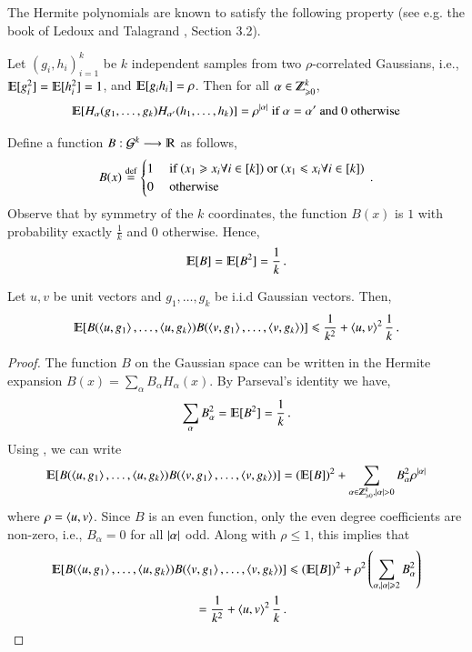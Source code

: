 \documentclass[11pt]{article}
\begin{document}
	The Hermite polynomials 
are known to satisfy the following
	property (see e.g. the book of Ledoux and Talagrand
	\cite{LedouxT}, Section 3.2).
	\begin{fact} \label{fact:rho}
	Let $(g_i,h_i)_{i=1}^k$ be $k$ independent samples from two
	$\rho$-correlated Gaussians, i.e., $\E[g_i^2] = \E[h_i^2] = 1$,
	and $\E[g_i h_i] = \rho$.  Then for all $\alpha \in \N^k$,
	$$ \E[H_{\alpha}(g_1,\ldots,g_k)H_{\alpha'}(h_1,\ldots,h_k)] =
	\rho^{\Abs{\alpha}} \text{ if } \alpha = \alpha' \textrm{ and }   0 \text{
	otherwise}$$
	\end{fact}

	Define a function $B: \cG^k \longrightarrow \mathbb{R}$ as follows,
\[ B(x) \stackrel{\textup{def}}{=} \begin{cases} 1 & \textrm{ if } (x_1 \geqslant x_i \forall i \in [k]) \textrm{ or } (x_1 \leqslant x_i \forall i \in
	[k]) \\ 		0 & \textrm{ otherwise } \end{cases} \,. \]
Observe that by symmetry of the $k$ coordinates, the function $B(x)$
is $1$ with probability exactly $\frac{1}{k}$ and $0$ otherwise.
Hence,
\[  \E[B] = \E[B^2] = \frac{1}{k} \mper \]	
%
\begin{lemma} 
\label{lem:product-of-max}
Let $u,v$ be unit vectors and $g_1,\ldots,g_k$ be i.i.d Gaussian vectors.  Then,
\[ \E[B(\inprod{u,g_1},\ldots,\inprod{u,g_k})B(\inprod{v,g_1},\ldots,\inprod{v,g_k})] \leq 
 \frac{1}{k^2} +  \inprod{u,v}^2 \frac{1}{k} \mper \]
\end{lemma}
\begin{proof}
The function $B$ on the Gaussian space can be written in the Hermite expansion 
$B(x) = \sum_{\alpha} B_{\alpha} H_{\alpha}(x)$.  By Parseval's
identity we have,
\[ \sum_{\alpha} B_{\alpha}^2 = \E[B^2] = \frac{1}{k} \mper  \] %
%
Using , we can write
\[
 \E[B(\inprod{u,g_1},\ldots,\inprod{u,g_k})B(\inprod{v,g_1},\ldots,\inprod{v,g_k})]
 = (\E[B])^2 + \sum_{\alpha \in \N^k, \Abs{\alpha}>0} B_\alpha^2 \rho^{\Abs{\alpha}}  \]
where $\rho = \left\langle u,v\right\rangle$.  Since $B$ is an even function, only the even
degree coefficients are non-zero, i.e., $B_\alpha = 0$ for all 	$\left\lvert\alpha\right\rvert$ odd.  Along with $\rho \leq 1$, this implies that
\begin{align*}
 \E[B(\inprod{u,g_1},\ldots,\inprod{u,g_k}) B(\inprod{v,g_1},\ldots,\inprod{v,g_k})]
& \leq (\E[B])^2 + \rho^2 \left( \sum_{\alpha, \Abs{\alpha}\geq 2} B_\alpha^2 \right) \\
= \frac{1}{k^2} +  \inprod{u,v}^2 \frac{1}{k} \mper
\end{align*}
\end{proof}
\end{document}
